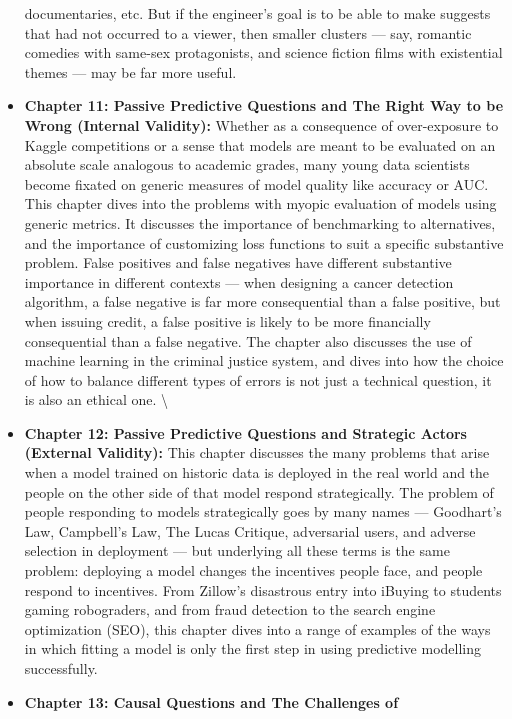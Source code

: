 \documentclass[12pt]{article}
\begin{document}
\begin{itemize}
  documentaries, etc. But if the engineer's goal is to be able to make
  suggests that had not occurred to a viewer, then smaller clusters ---
  say, romantic comedies with same-sex protagonists, and science fiction
  films with existential themes --- may be far more useful.
\item
  \textbf{Chapter 11: Passive Predictive Questions and The Right Way to
  be Wrong (Internal Validity):} Whether as a consequence of
  over-exposure to Kaggle competitions or a sense that models are meant
  to be evaluated on an absolute scale analogous to academic grades,
  many young data scientists become fixated on generic measures of model
  quality like accuracy or AUC. This chapter dives into the problems
  with myopic evaluation of models using generic metrics. It discusses
  the importance of benchmarking to alternatives, and the importance of
  customizing loss functions to suit a specific substantive problem.
  False positives and false negatives have different substantive
  importance in different contexts --- when designing a cancer detection
  algorithm, a false negative is far more consequential than a false
  positive, but when issuing credit, a false positive is likely to be
  more financially consequential than a false negative. The chapter also
  discusses the use of machine learning in the criminal justice system,
  and dives into how the choice of how to balance different types of
  errors is not just a technical question, it is also an ethical one.
  \textbackslash{}
\item
  \textbf{Chapter 12: Passive Predictive Questions and Strategic Actors
  (External Validity):} This chapter discusses the many problems that
  arise when a model trained on historic data is deployed in the real
  world and the people on the other side of that model respond
  strategically. The problem of people responding to models
  strategically goes by many names --- Goodhart's Law, Campbell's Law,
  The Lucas Critique, adversarial users, and adverse selection in
  deployment --- but underlying all these terms is the same problem:
  deploying a model changes the incentives people face, and people
  respond to incentives. From Zillow's disastrous entry into iBuying to
  students gaming robograders, and from fraud detection to the search
  engine optimization (SEO), this chapter dives into a range of examples
  of the ways in which fitting a model is only the first step in using
  predictive modelling successfully.\\
\item
  \textbf{Chapter 13: Causal Questions and The Challenges of
}
\end{itemize}
\end{document}
